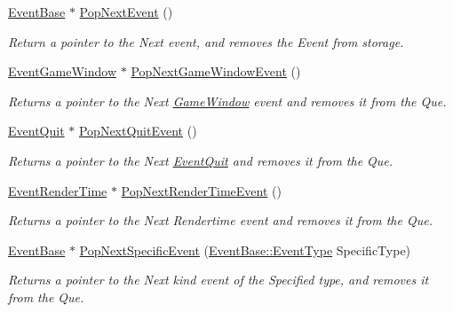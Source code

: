\begin{DoxyCompactItemize}
\hyperlink{classphys_1_1EventBase}{EventBase} $\ast$ \hyperlink{classphys_1_1EventManager_ae403b203bc425744377ec5fc311f4e5d}{PopNextEvent} ()
\begin{DoxyCompactList}\small\item\em Return a pointer to the Next event, and removes the Event from storage. \item\end{DoxyCompactList}\item 
\hyperlink{classphys_1_1EventGameWindow}{EventGameWindow} $\ast$ \hyperlink{classphys_1_1EventManager_abc62c29549957c314a8784eac4fb16ad}{PopNextGameWindowEvent} ()
\begin{DoxyCompactList}\small\item\em Returns a pointer to the Next \hyperlink{classphys_1_1GameWindow}{GameWindow} event and removes it from the Que. \item\end{DoxyCompactList}\item 
\hyperlink{classphys_1_1EventQuit}{EventQuit} $\ast$ \hyperlink{classphys_1_1EventManager_a9b0d8e4d76fef35423bb862d7127b747}{PopNextQuitEvent} ()
\begin{DoxyCompactList}\small\item\em Returns a pointer to the Next \hyperlink{classphys_1_1EventQuit}{EventQuit} and removes it from the Que. \item\end{DoxyCompactList}\item 
\hyperlink{classphys_1_1EventRenderTime}{EventRenderTime} $\ast$ \hyperlink{classphys_1_1EventManager_aa7e800d34ad8b9295ac87dfa822a2a03}{PopNextRenderTimeEvent} ()
\begin{DoxyCompactList}\small\item\em Returns a pointer to the Next Rendertime event and removes it from the Que. \item\end{DoxyCompactList}\item 
\hyperlink{classphys_1_1EventBase}{EventBase} $\ast$ \hyperlink{classphys_1_1EventManager_a156ba3c53cc799499272430111bbdfa4}{PopNextSpecificEvent} (\hyperlink{classphys_1_1EventBase_a5e6a8564e127f654123f0bf6a2751923}{EventBase::EventType} SpecificType)
\begin{DoxyCompactList}\small\item\em Returns a pointer to the Next kind event of the Specified type, and removes it from the Que. \item\end{DoxyCompactList}\item 

\end{DoxyCompactItemize}
